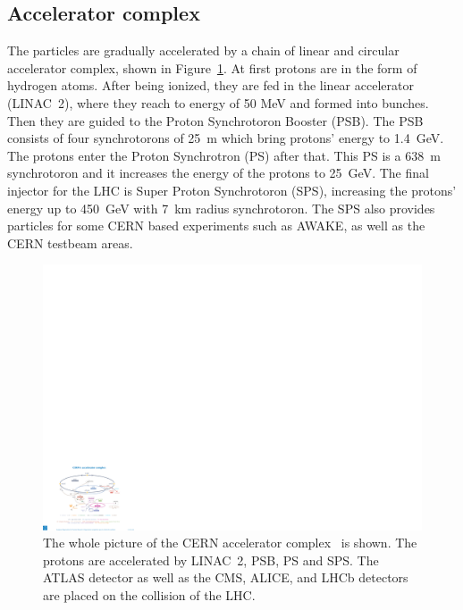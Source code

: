 \subsection{Accelerator complex}
The particles are gradually accelerated by a chain of linear and circular accelerator complex, shown in Figure~\ref{fig:accelerator}. At first protons are in the form of hydrogen atoms. After being ionized, they are fed in the linear accelerator (LINAC~2), where they reach to energy of 50 MeV and formed into bunches. Then they are guided to the Proton Synchrotoron Booster (PSB). The PSB consists of four synchrotorons of 25~m which bring protons' energy to 1.4~GeV. The protons enter the Proton Synchrotron (PS) after that. This PS is a 638~m synchrotoron and it increases the energy of the protons to 25~GeV. The final injector for the LHC is Super Proton Synchrotoron (SPS), increasing the protons' energy up to 450~GeV with 7~km radius synchrotoron. The SPS also provides particles for some CERN based experiments such as AWAKE, as well as the CERN testbeam areas. \\
\begin{figure}[tbp]
\begin{center}
 \includegraphics[width=1.1\textwidth,keepaspectratio]{figures/detector/CERN}
\caption{
The whole picture of the CERN accelerator complex~\cite{accelerator} is shown. The protons are accelerated by LINAC~2, PSB, PS and SPS.
The ATLAS detector as well as the CMS, ALICE, and LHCb detectors are placed on the collision of the LHC.
}
\label{fig:accelerator}
\end{center}
\end{figure}
